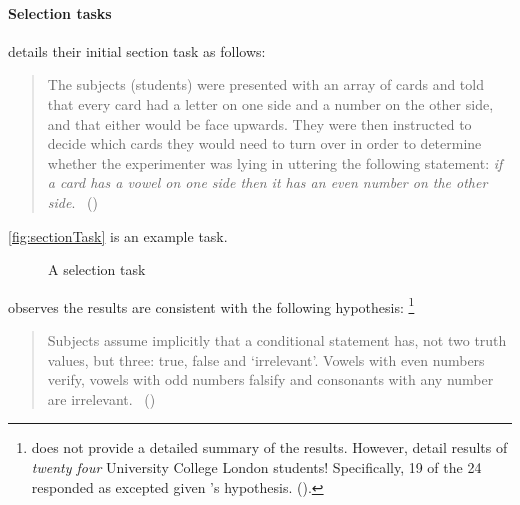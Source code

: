 \paragraph*{Selection tasks}
\nocite{Wason:1968aa}
\nocite{Wason:1971aa}
\label{par:selection-tasks}


\begin{note}
  \citeauthor{Wason:1966aa} details their initial section task as follows:
  \begin{quote}
    The subjects (students) were presented with an array of cards and told that every card had a letter on one side and a number on the other side, and that either would be face upwards.
    They were then instructed to decide which cards they would need to turn over in order to determine whether the experimenter was lying in uttering the following statement:
    \emph{if a card has a vowel on one side then it has an even number on the other side}.%
    \mbox{ }\hfill\mbox{(\citeyear[145--146]{Wason:1966aa})}
  \end{quote}
  \autoref{fig:sectionTask} is an example task.
  \begin{figure}[H]
    \centering
    \caption{A selection task}
    \label{fig:sectionTask}
  \end{figure}

  \citeauthor{Wason:1966aa} observes the results are consistent with the following hypothesis:%
  \footnote{
    \citeauthor{Wason:1966aa} does not provide a detailed summary of the results.
    However, \citeauthor{Johnson-Laird:1969aa} detail results of \emph{twenty four} University College London students!
    Specifically, 19 of the 24 responded as excepted given \citeauthor{Wason:1966aa}'s hypothesis.
    (\citeyear[369--370]{Johnson-Laird:1969aa}).
  }
  \begin{quote}
    Subjects assume implicitly that a conditional statement has, not two truth values, but three: true, false and `irrelevant'.
    Vowels with even numbers verify, vowels with odd numbers falsify and consonants with any number are irrelevant.%
    \mbox{ }\hfill\mbox{(\citeyear[146]{Wason:1966aa})}
  \end{quote}
\end{note}


